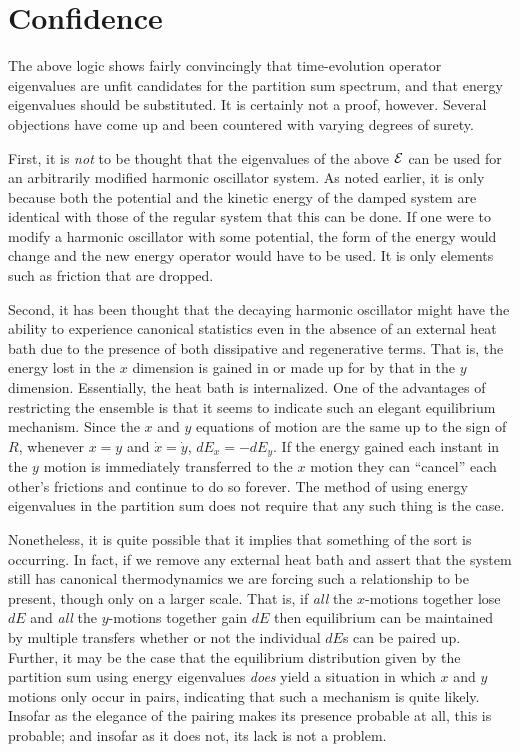 \section{Confidence}

The above logic shows fairly convincingly that time-evolution operator 
eigenvalues are unfit candidates for the partition sum spectrum, and that
energy eigenvalues should be substituted.  It is certainly not a proof,
however.  Several objections have come up and been countered with varying 
degrees of surety.

First, it is {\em not} to be thought that the eigenvalues of the above 
${\cal E}$ can be used for an arbitrarily modified harmonic oscillator system.
As noted earlier, it is only because both the potential and the kinetic
energy of the damped system are identical with those of the regular system
that this can be done.  If one were to modify a harmonic oscillator with some
potential, the form of the energy would change and the new energy operator
would have to be used.  It is only elements such as friction that are dropped.

Second, it has been thought that the decaying harmonic oscillator might have 
the ability to experience canonical statistics even in the absence of an 
external heat bath due to the presence of both dissipative and regenerative 
terms.  That is, the energy lost in the $x$ dimension is gained in or made up 
for by that in the $y$ dimension.  Essentially, the heat bath is internalized.
One of the advantages of restricting the ensemble is that it seems to indicate
such an elegant equilibrium mechanism.  Since the $x$ and $y$ equations of
motion are the same up to the sign of $R$, whenever $x = y$ and $\dot{x} = 
\dot{y}$, $dE_{x} = - dE_{y}$.  If the energy gained each instant in the
$y$ motion is immediately transferred to the $x$ motion they can ``cancel''
each other's frictions and continue to do so forever.  The method of using
energy eigenvalues in the partition sum does not require that any
such thing is the case.

Nonetheless, it is quite possible that it implies that something of the sort
is occurring.  In fact, if we remove any external heat bath and assert that
the system still has canonical thermodynamics we are forcing such a 
relationship to be present, though only on a larger scale.  That is, if 
{\em all} the $x$-motions together lose $dE$ and {\em all} the 
$y$-motions together gain $dE$ then equilibrium can be maintained by multiple
transfers whether or not the individual $dE$s can be paired up.  Further, it
may be the case that the equilibrium distribution given by the partition sum
using energy eigenvalues {\em does} yield a situation in which $x$ and $y$
motions only occur in pairs, indicating that such a mechanism is quite likely.
Insofar as the elegance of the pairing makes its presence probable at all,
this is probable; and insofar as it does not, its lack is not a problem.


